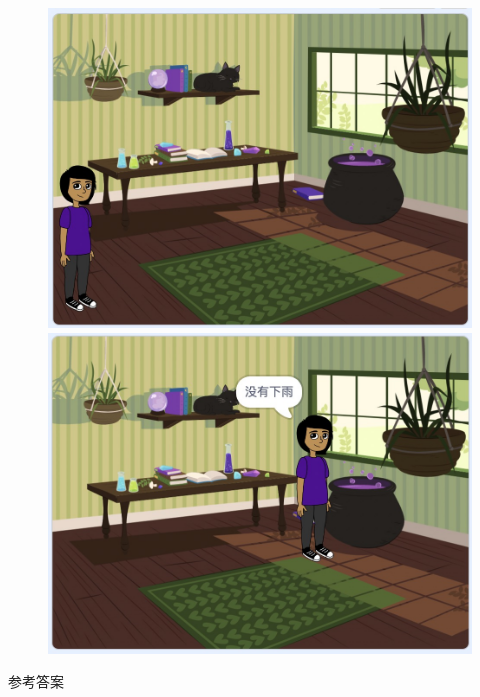 \documentclass[10pt, a4paper]{article}
\begin{document}
\begin{enumerate}
\begin{figure}[htb]
\begin{minipage}[t]{.23\textwidth}
                \includegraphics[width=\textwidth]{37-3.jpg}
            \end{minipage}
            \begin{minipage}[t]{.23\textwidth}
                \centering
                \includegraphics[width=\textwidth]{37-4.jpg}
            \end{minipage}
        \end{figure}
    \end{enumerate}

    \newpage
    \begin{center}
        \Huge \heiti 参考答案
    \end{center}
\end{document}
